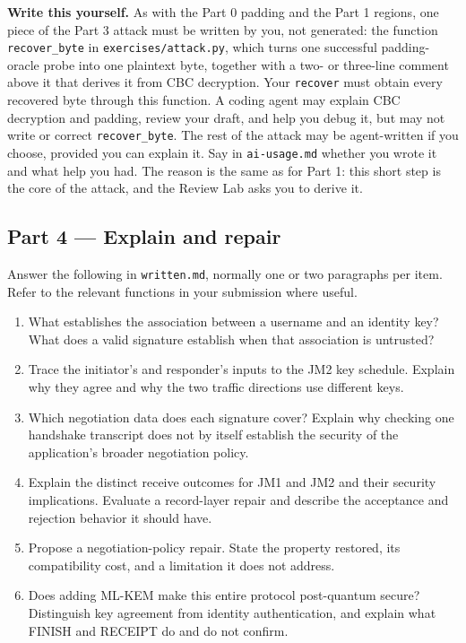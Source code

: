 \documentclass[11pt]{article}
\begin{document}
\textbf{Write this yourself.} As with the Part 0 padding and the Part 1 regions, one piece of the Part 3 attack must be written by you, not generated: the function \texttt{recover\_byte} in \texttt{exercises/attack.py}, which turns one successful padding-oracle probe into one plaintext byte, together with a two- or three-line comment above it that derives it from CBC decryption. Your \texttt{recover} must obtain every recovered byte through this function. A coding agent may explain CBC decryption and padding, review your draft, and help you debug it, but may not write or correct \texttt{recover\_byte}. The rest of the attack may be agent-written if you choose, provided you can explain it. Say in \texttt{ai-{}usage.md} whether you wrote it and what help you had. The reason is the same as for Part 1: this short step is the core of the attack, and the Review Lab asks you to derive it.

\subsection*{Part 4 --- Explain and repair}

Answer the following in \texttt{written.md}, normally one or two paragraphs per item. Refer to the relevant functions in your submission where useful.

\begin{enumerate}
\item What establishes the association between a username and an identity key? What does a valid signature establish when that association is untrusted?
\item Trace the initiator's and responder's inputs to the JM2 key schedule. Explain why they agree and why the two traffic directions use different keys.
\item Which negotiation data does each signature cover? Explain why checking one handshake transcript does not by itself establish the security of the application's broader negotiation policy.
\item Explain the distinct receive outcomes for JM1 and JM2 and their security implications. Evaluate a record-layer repair and describe the acceptance and rejection behavior it should have.
\item Propose a negotiation-policy repair. State the property restored, its compatibility cost, and a limitation it does not address.
\item Does adding ML-KEM make this entire protocol post-quantum secure? Distinguish key agreement from identity authentication, and explain what FINISH and RECEIPT do and do not confirm.
\end{enumerate}
\end{document}
